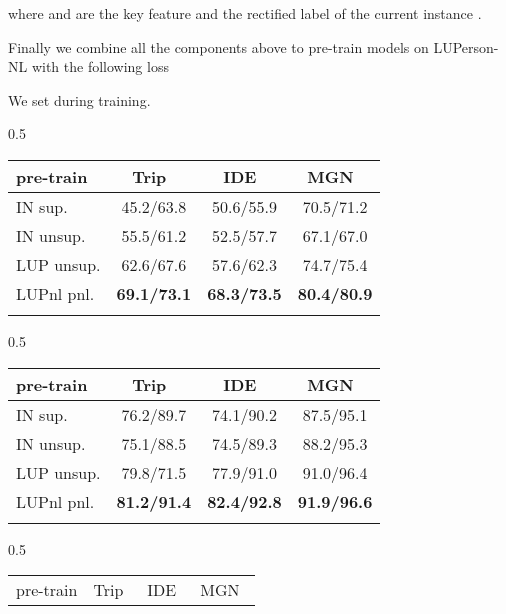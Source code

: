 \documentclass[10pt,twocolumn,letterpaper]{article}
\begin{document}
where  and  are the key feature and the rectified label of the current instance . 

Finally we combine all the components above to pre-train models on LUPerson-NL with the following loss 


We set  during training.


\begin{table*}[htb]
\setlength{\tabcolsep}{3.3mm}
    \begin{subtable}[h]{0.5\textwidth}
        \centering
\begin{tabular}{l|ccc}
        \shline
        pre-train & Trip~\cite{hermans2017defense} & IDE~\cite{zheng2017person} & MGN~\cite{wang2018learning} \\
        \hline
        IN sup.     & 45.2/63.8 & 50.6/55.9 & 70.5/71.2 \\
        IN unsup.   & 55.5/61.2 & 52.5/57.7 & 67.1/67.0 \\ 
        LUP unsup.  & 62.6/67.6 & 57.6/62.3 & 74.7/75.4 \\ 
        \hline
        LUPnl pnl. & \textbf{69.1/73.1} & \textbf{68.3/73.5} & \textbf{80.4/80.9} \\
        \shline
        \end{tabular}
\caption{CUHK03}
        \label{tab:improve-cuhk}
    \end{subtable}
    \hfill
    \begin{subtable}[h]{0.5\textwidth}
        \centering
\begin{tabular}{l|ccc}
        \shline
        pre-train & Trip~\cite{hermans2017defense} & IDE~\cite{zheng2017person} & MGN~\cite{wang2018learning} \\
        \hline
        IN sup.    & 76.2/89.7 & 74.1/90.2 & 87.5/95.1 \\
        IN unsup.  & 75.1/88.5 & 74.5/89.3 & 88.2/95.3 \\ 
        LUP unsup. & 79.8/71.5 & 77.9/91.0 & 91.0/96.4 \\ 
        \hline
        LUPnl pnl. & \textbf{81.2/91.4} & \textbf{82.4/92.8} & \textbf{91.9/96.6} \\
        \shline
        \end{tabular}
\caption{Market1501}
        \label{tab:improve-market}
    \end{subtable}
    \hfill
    \begin{subtable}[h]{0.5\textwidth}
        \centering
\begin{tabular}{l|ccc}
        \shline
        pre-train & Trip~\cite{hermans2017defense} & IDE~\cite{zheng2017person} & MGN~\cite{wang2018learning} \\

\end{tabular}
\end{subtable}
\end{table*}
\end{document}
